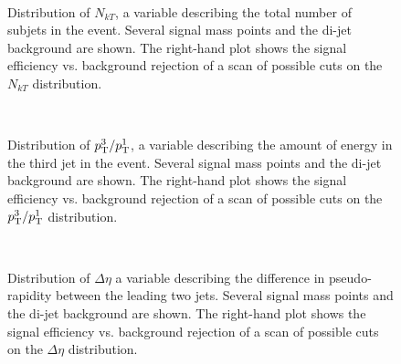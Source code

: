 



\begin{figure}
\centering
{}\\
\caption{Distribution of $N_{kT}$, a variable describing the total number of \kt subjets in the event. Several signal mass points and the \herwigpp di-jet background are shown. The right-hand plot shows the signal efficiency vs. background rejection of a scan of possible cuts on the $N_{kT}$ distribution.}
\label{fig:search:search:optimization:NKT}
\end{figure}






\begin{figure}
\centering
{}\\
\caption{Distribution of $p_{\text{T}}^3/p_{\text{T}}^1$, a variable describing the amount of energy in the third jet in the event. Several signal mass points and the \herwigpp di-jet background are shown. The right-hand plot shows the signal efficiency vs. background rejection of a scan of possible cuts on the $p_{\text{T}}^3/p_{\text{T}}^1$ distribution.}
\label{fig:search:search:optimization:PT31}
\end{figure}




\begin{figure}
\centering
{}\\
\caption{Distribution of $\Delta \eta$ a variable describing the difference in pseudo-rapidity between the leading two jets. Several signal mass points and the \herwigpp di-jet background are shown. The right-hand plot shows the signal efficiency vs. background rejection of a scan of possible cuts on the $\Delta \eta$ distribution.}
\label{fig:search:search:optimization:DEta}
\end{figure}

